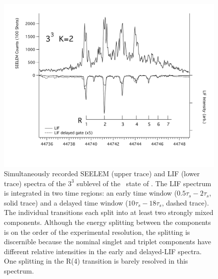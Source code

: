 \documentclass[12pt]{mitthesis}
\begin{document}


\begin{figure}
  \caption{Simultaneously recorded SEELEM (upper trace) and LIF (lower
    trace) spectra of the $3^3$  sublevel of the \astate\ state
    of .  The LIF spectrum is integrated in two time regions:
    an early time window ($0.5\tau_s-2\tau_s$, solid trace) and a
    delayed time window ($10\tau_s-18\tau_s$, dashed trace).  The
    individual transitions each split into at least two strongly mixed
    components.  Although the energy splitting between the components
    is on the order of the experimental resolution, the splitting is
    discernible because the nominal singlet and triplet components
    have different relative intensities in the early and delayed-LIF
    spectra.  One splitting in the R(4) transition is barely resolved
    in this spectrum.}
  \label{fig:spectrum-33k2}
  \centering
  \includegraphics[width=7in,angle=90]{spectrum-33k2-r1r7.pdf}
\end{figure}
\end{document}
